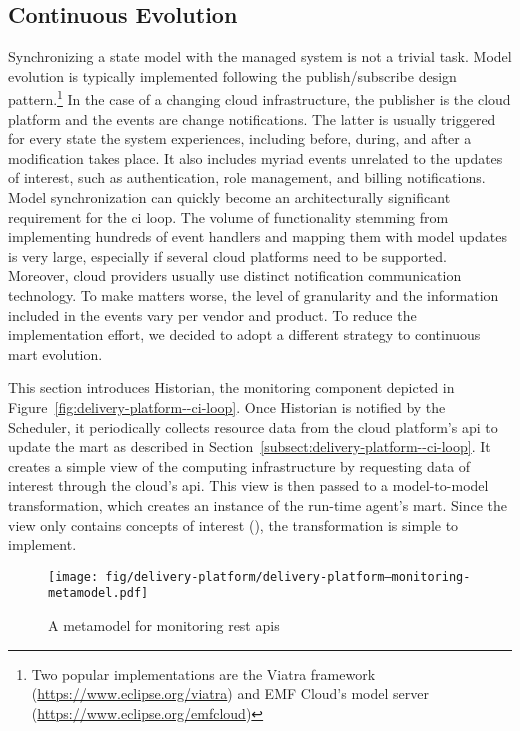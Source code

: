 \subsection{Continuous  Evolution}
\label{subsect:delivery-platform--continuous-model-evolution}

Synchronizing a state model with the managed system is not a trivial task. Model evolution is typically implemented following the publish/subscribe design pattern.\footnote{Two popular implementations are the Viatra framework (\url{https://www.eclipse.org/viatra}) and EMF Cloud's model server (\url{https://www.eclipse.org/emfcloud})} In the case of a changing cloud infrastructure, the publisher is the cloud platform and the events are change notifications. The latter is usually triggered for every state the system experiences, including before, during, and after a modification takes place. It also includes myriad events unrelated to the updates of interest, such as authentication, role management, and billing notifications. Model synchronization can quickly become an architecturally significant requirement for the \gls{ci} loop. The volume of functionality stemming from implementing hundreds of event handlers and mapping them with model updates is very large, especially if several cloud platforms need to be supported. Moreover, cloud providers usually use distinct notification communication technology. To make matters worse, the level of granularity and the information included in the events vary per vendor and product. To reduce the implementation effort, we decided to adopt a different strategy to continuous \gls{mart} evolution.

This section introduces Historian, the monitoring component depicted in Figure~\ref{fig:delivery-platform--ci-loop}. Once Historian is notified by the Scheduler, it periodically collects resource data from the cloud platform's \gls{api} to update the \gls{mart} as described in Section~\ref{subsect:delivery-platform--ci-loop}. It creates a simple view of the computing infrastructure by requesting data of interest through the cloud's \gls{api}. This view is then passed to a model-to-model transformation, which creates an instance of the run-time agent's \gls{mart}. Since the view only contains concepts of interest (), the transformation is simple to implement.

\begin{figure}[h]
	\centering
	\texttt{[image: fig/delivery-platform/delivery-platform--monitoring-metamodel.pdf]}
	\caption{A metamodel for monitoring \gls{rest} \glspl{api}}
	\label{fig:delivery-platform--monitoring-metamodel}
\end{figure}

